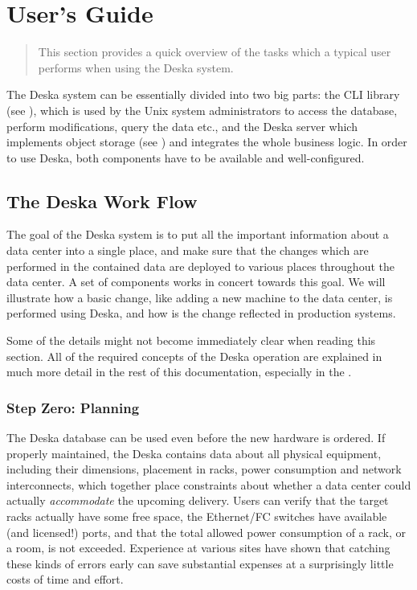 \documentclass[deska]{subfiles}
\begin{document}
\chapter{User's Guide}
\label{sec:user-intro}

\begin{abstract}
This section provides a quick overview of the tasks which a typical user performs when using the Deska system.
\end{abstract}

The Deska system can be essentially divided into two big parts: the CLI library (see ), which is
used by the Unix system administrators to access the database, perform modifications, query the data etc., and the
Deska server which implements object storage (see ) and integrates the whole business logic.
In order to use Deska, both components have to be available and well-configured.

\section{The Deska Work Flow}
\label{sec:user-workflow}

The goal of the Deska system is to put all the important information about a data center into a single place, and make
sure that the changes which are performed in the contained data are deployed to various places throughout the data
center.  A set of components works in concert towards this goal. We will illustrate how a basic change, like adding a
new machine to the data center, is performed using Deska, and how is the change reflected in production systems.

Some of the details might not become immediately clear when reading this section.  All of the required concepts of the
Deska operation are explained in much more detail in the rest of this documentation, especially in the
.

\subsection{Step Zero: Planning}

The Deska database can be used even before the new hardware is ordered.  If properly maintained, the Deska contains data
about all physical equipment, including their dimensions, placement in racks, power consumption and network
interconnects, which together place constraints about whether a data center could actually {\em accommodate} the
upcoming delivery.  Users can verify that the target racks actually have some free space, the Ethernet/FC switches have
available (and licensed!) ports, and that the total allowed power consumption of a rack, or a room, is not exceeded.
Experience at various sites have shown that catching these kinds of errors early can save substantial expenses at a
surprisingly little costs of time and effort.
\end{document}
